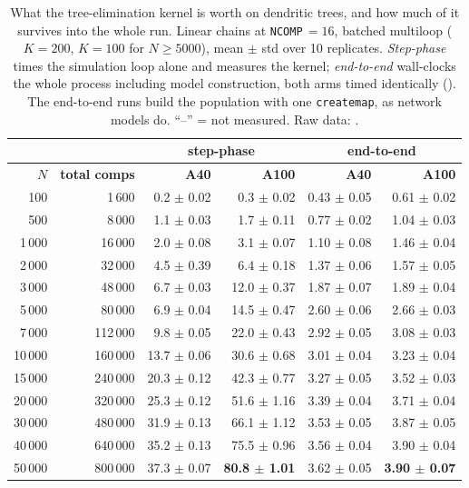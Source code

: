 \documentclass[preprint,12pt, a4paper]{elsarticle}
\begin{document}
\begin{enumerate}
\begin{table}[!h]
\centering
\small
\begin{tabular}{|r|r|r|r|r|r|}
\hline
& & \multicolumn{2}{c|}{\textbf{step-phase}} & \multicolumn{2}{c|}{\textbf{end-to-end}} \\
\hline
\textbf{$N$} & \textbf{total comps} & \textbf{A40} & \textbf{A100} & \textbf{A40} & \textbf{A100} \\
\hline
100   & 1\,600  & 0.2 $\pm$ 0.02 & 0.3 $\pm$ 0.02 & 0.43 $\pm$ 0.05 & 0.61 $\pm$ 0.02 \\
\hline
500   & 8\,000  & 1.1 $\pm$ 0.03 & 1.7 $\pm$ 0.11 & 0.77 $\pm$ 0.02 & 1.04 $\pm$ 0.03 \\
\hline
1\,000 & 16\,000 & 2.0 $\pm$ 0.08 & 3.1 $\pm$ 0.07 & 1.10 $\pm$ 0.08 & 1.46 $\pm$ 0.04 \\
\hline
2\,000 & 32\,000 & 4.5 $\pm$ 0.39 & 6.4 $\pm$ 0.18 & 1.37 $\pm$ 0.06 & 1.57 $\pm$ 0.05 \\
\hline
3\,000 & 48\,000 & 6.7 $\pm$ 0.03 & 12.0 $\pm$ 0.37 & 1.87 $\pm$ 0.07 & 1.89 $\pm$ 0.04 \\
\hline
5\,000 & 80\,000 & 6.9 $\pm$ 0.04 & 14.5 $\pm$ 0.47 & 2.60 $\pm$ 0.06 & 2.66 $\pm$ 0.03 \\
\hline
7\,000 & 112\,000 & 9.8 $\pm$ 0.05 & 22.0 $\pm$ 0.43 & 2.92 $\pm$ 0.05 & 3.08 $\pm$ 0.03 \\
\hline
10\,000 & 160\,000 & 13.7 $\pm$ 0.06 & 30.6 $\pm$ 0.68 & 3.01 $\pm$ 0.04 & 3.23 $\pm$ 0.04 \\
\hline
15\,000 & 240\,000 & 20.3 $\pm$ 0.12 & 42.3 $\pm$ 0.77 & 3.27 $\pm$ 0.05 & 3.52 $\pm$ 0.03 \\
\hline
20\,000 & 320\,000 & 25.3 $\pm$ 0.12 & 51.6 $\pm$ 1.16 & 3.39 $\pm$ 0.04 & 3.71 $\pm$ 0.04 \\
\hline
30\,000 & 480\,000 & 31.9 $\pm$ 0.13 & 66.1 $\pm$ 1.12 & 3.53 $\pm$ 0.05 & 3.87 $\pm$ 0.05 \\
\hline
40\,000 & 640\,000 & 35.2 $\pm$ 0.13 & 75.5 $\pm$ 0.96 & 3.56 $\pm$ 0.04 & 3.90 $\pm$ 0.04 \\
\hline
50\,000 & 800\,000 & 37.3 $\pm$ 0.07 & \textbf{80.8 $\pm$ 1.01} & 3.62 $\pm$ 0.05 & \textbf{3.90 $\pm$ 0.07} \\
\hline
\end{tabular}
\caption{What the tree-elimination kernel is worth on dendritic trees, and how much of it survives into the whole run. Linear chains at \texttt{NCOMP}\,$=16$, batched multiloop ($K=200$, $K=100$ for $N\geq5000$), mean $\pm$ std over 10 replicates. \emph{Step-phase} times the simulation loop alone and measures the kernel; \emph{end-to-end} wall-clocks the whole process including model construction, both arms timed identically (\protect{}). The end-to-end runs build the population with one \texttt{createmap}, as network models do. ``--'' = not measured. Raw data: \protect{}.}
\label{tab:multicomp}
\end{table}


\end{enumerate}
\end{document}
